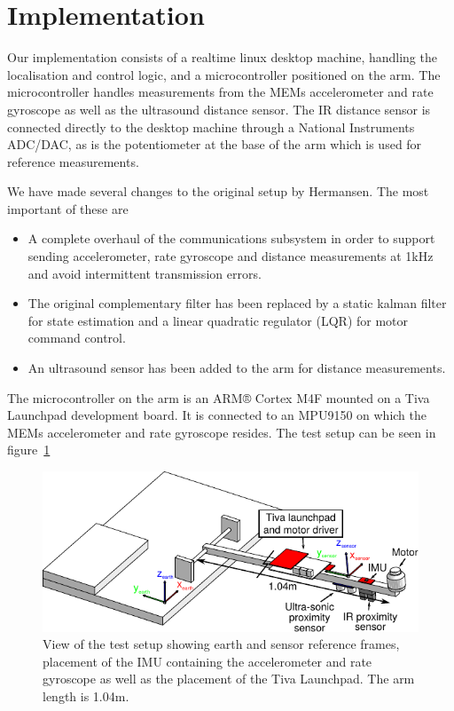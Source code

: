 \section{Implementation}
Our implementation consists of a realtime linux desktop machine, handling the localisation and control logic, and a microcontroller
positioned on the arm. The microcontroller handles measurements from the MEMs accelerometer and rate gyroscope as well as the ultrasound
distance sensor. The IR distance sensor is connected directly to the desktop machine through a National Instruments ADC/DAC, as is the 
potentiometer at the base of the arm which is used for reference measurements.

We have made several changes to the original setup by Hermansen. The most important of these are

\begin{itemize}
		\item A complete overhaul of the communications subsystem in order to support sending accelerometer, rate gyroscope and 
			distance measurements at 1kHz and avoid intermittent transmission errors. 
		\item The original complementary filter has been replaced by a static kalman filter for state estimation and a linear 
			quadratic regulator (LQR)\cite{Hendricks2008} for motor command control.
			\item An ultrasound sensor has been added to the arm for distance measurements.
\end{itemize}

The microcontroller on the arm is an ARM® Cortex M4F mounted on a Tiva Launchpad development board.
It is connected to an MPU9150 on which the MEMs accelerometer and rate gyroscope resides.
The test setup can be seen in figure~\ref{fig:labsetup}
\begin{figure}
	\centering
	\includegraphics[width=\columnwidth]{pictures/arbejds_tegning}
	\caption{View of the test setup showing earth and sensor reference frames, placement of the IMU containing the 
	accelerometer and rate gyroscope as well as the placement of the Tiva Launchpad. The arm length is 1.04m.}
	\label{fig:labsetup}
\end{figure}

